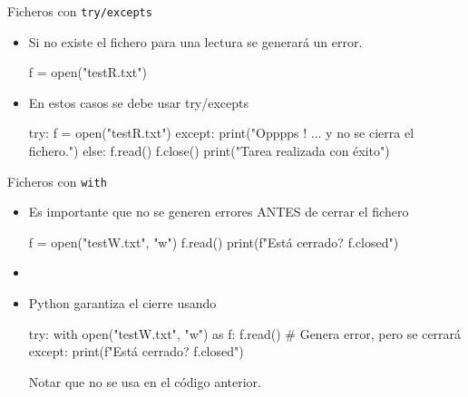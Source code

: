\documentclass[10pt, envcountsect , spanish]{beamer}
\begin{document}
\begin{frame}[fragile]{Ficheros con {\tt try/excepts}} 

\begin{itemize}
\item Si no existe el fichero para una lectura se  generará un error.
{\small
\begin{pyconsole}[][frame=single]%

f = open("testR.txt")
\end{pyconsole}
}

\item En estos casos se debe usar try/excepts
{\small
\begin{pyconsole}[][frame=single]%

try:
  f = open("testR.txt")
except:
  print("Opppps ! ... y no se cierra el fichero.") 
else:
  f.read()
  f.close()
  print("Tarea realizada con éxito")
  
\end{pyconsole}
}
\end{itemize}

\end{frame}







\begin{frame}[fragile]{Ficheros con {\tt with}} 

\begin{itemize}
\item Es importante que no se generen errores ANTES de cerrar el fichero
{\small
\begin{pyconsole}[][frame=single]%

f = open("testW.txt", "w")
f.read()
print(f"Está cerrado? {f.closed}")
\end{pyconsole}
}

\item {}

\item Python garantiza el cierre usando 
{\small
\begin{pyconsole}[][frame=single]%

try:
  with open("testW.txt", "w") as f:
    f.read()            # Genera error, pero se cerrará
except:
  print(f"Está cerrado? {f.closed}")

\end{pyconsole}
}

Notar que no se usa  en el código anterior.
\end{itemize}

\end{frame}
\end{document}
